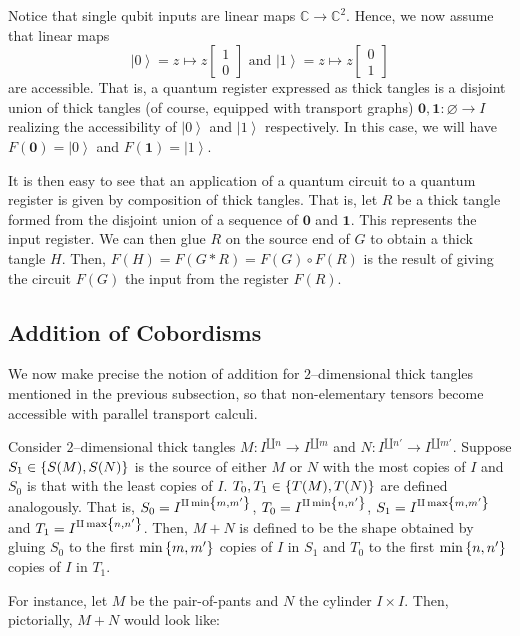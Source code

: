 \documentclass{amsart}
\newcommand{\C}{\mathbb{C}}
\renewcommand{\to}[1][]{\stackrel{#1}{\longrightarrow}}
\renewcommand{\mapsto}{\longmapsto}
\newcommand{\curly}[1]{\left\{ #1 \right\}}
\newcommand{\set}[2][]{\ifthenelse{\equal{#1}{}}
                                  {\curly{#2}}
                                  {\curly{#1\ \textbf{:}\ #2}}}
\newcommand{\bmat}[1]{\begin{bmatrix} #1 \end{bmatrix}}
\newcommand{\ket}[1]{\left| #1 \right\rangle}
\numberwithin{thm}{section}
\theoremstyle{definition}
\begin{document}
Notice that single qubit inputs are linear maps $\C \to \C^2$. Hence, we now
assume that linear maps
\[
  \ket{0} = z \mapsto z\bmat{1 \\ 0} \text{ and }
  \ket{1} = z \mapsto z \bmat{0 \\ 1}
\]
are accessible. That is, a quantum register expressed as thick tangles is a
disjoint union of thick tangles (of course, equipped with transport graphs)
$\mathbf{0}, \mathbf{1} : \varnothing \to I$ realizing the accessibility of
$\ket{0}$ and $\ket{1}$ respectively. In this case, we will have
$F(\mathbf{0}) = \ket{0}$ and $F(\mathbf{1}) = \ket{1}$.

It is then easy to see that an application of a quantum circuit to a quantum
register is given by composition of thick tangles. That is, let $R$ be a thick
tangle formed from the disjoint union of a sequence of $\mathbf{0}$ and
$\mathbf{1}$. This represents the input register. We can then glue $R$ on the
source end of $G$ to obtain a thick tangle $H$. Then,
$F(H) = F(G * R) = F(G) \circ F(R)$ is the result of giving the circuit
$F(G)$ the input from the register $F(R)$.

%

\subsection{Addition of Cobordisms}

We now make precise the notion of addition for $2$--dimensional thick tangles
mentioned in the previous subsection, so that non-elementary tensors become
accessible with parallel transport calculi.

Consider $2$--dimensional thick tangles $M : I^{\amalg n} \to I^{\amalg m}$ and
$N : I^{\amalg n'} \to I^{\amalg m'}$. Suppose $S_1 \in \set{S(M), S(N)}$ is the
source of either $M$ or $N$ with the most copies of $I$ and $S_0$ is that with
the least copies of $I$. $T_0, T_1 \in \set{T(M), T(N)}$ are defined
analogously. That is, $S_0 = I^{\amalg \min\set{m, m'}}$,
$T_0 = I^{\amalg \min\set{n, n'}}$, $S_1 = I^{\amalg \max\set{m, m'}}$ and
$T_1 = I^{\amalg \max\set{n, n'}}$. Then, $M + N$ is defined to be the shape
obtained by gluing $S_0$ to the first $\min\set{m, m'}$ copies of $I$ in
$S_1$ and $T_0$ to the first $\min\set{n, n'}$ copies of $I$ in $T_1$.

For instance, let $M$ be the pair-of-pants and $N$ the cylinder $I \times I$.
Then, pictorially, $M + N$ would look like:
\end{document}
